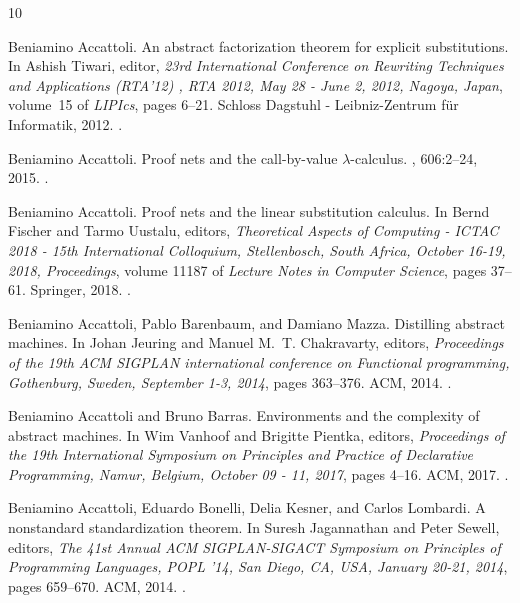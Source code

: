 \begin{thebibliography}{10}

Beniamino Accattoli.
\newblock An abstract factorization theorem for explicit substitutions.
\newblock In Ashish Tiwari, editor, {\em 23rd International Conference on
  Rewriting Techniques and Applications (RTA'12) , {RTA} 2012, May 28 - June 2,
  2012, Nagoya, Japan}, volume~15 of {\em LIPIcs}, pages 6--21. Schloss
  Dagstuhl - Leibniz-Zentrum f{\"{u}}r Informatik, 2012.
\newblock \href {https://doi.org/10.4230/LIPICS.RTA.2012.6}
  {}.

Beniamino Accattoli.
\newblock Proof nets and the call-by-value {\(\lambda\)}-calculus.
, 606:2--24, 2015.
\newblock \href {https://doi.org/10.1016/J.TCS.2015.08.006}
  {}.

Beniamino Accattoli.
\newblock Proof nets and the linear substitution calculus.
\newblock In Bernd Fischer and Tarmo Uustalu, editors, {\em Theoretical Aspects
  of Computing - {ICTAC} 2018 - 15th International Colloquium, Stellenbosch,
  South Africa, October 16-19, 2018, Proceedings}, volume 11187 of {\em Lecture
  Notes in Computer Science}, pages 37--61. Springer, 2018.
\newblock \href {https://doi.org/10.1007/978-3-030-02508-3\_3}
  {}.

Beniamino Accattoli, Pablo Barenbaum, and Damiano Mazza.
\newblock Distilling abstract machines.
\newblock In Johan Jeuring and Manuel M.~T. Chakravarty, editors, {\em
  Proceedings of the 19th {ACM} {SIGPLAN} international conference on
  Functional programming, Gothenburg, Sweden, September 1-3, 2014}, pages
  363--376. {ACM}, 2014.
\newblock \href {https://doi.org/10.1145/2628136.2628154}
  {}.

Beniamino Accattoli and Bruno Barras.
\newblock Environments and the complexity of abstract machines.
\newblock In Wim Vanhoof and Brigitte Pientka, editors, {\em Proceedings of the
  19th International Symposium on Principles and Practice of Declarative
  Programming, Namur, Belgium, October 09 - 11, 2017}, pages 4--16. {ACM},
  2017.
\newblock \href {https://doi.org/10.1145/3131851.3131855}
  {}.

Beniamino Accattoli, Eduardo Bonelli, Delia Kesner, and Carlos Lombardi.
\newblock A nonstandard standardization theorem.
\newblock In Suresh Jagannathan and Peter Sewell, editors, {\em The 41st Annual
  {ACM} {SIGPLAN-SIGACT} Symposium on Principles of Programming Languages,
  {POPL} '14, San Diego, CA, USA, January 20-21, 2014}, pages 659--670. {ACM},
  2014.
\newblock \href {https://doi.org/10.1145/2535838.2535886}
  {}.


\end{thebibliography}
